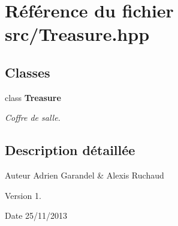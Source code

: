 \section{Référence du fichier src/\-Treasure.hpp}
\label{_treasure_8hpp}
\subsection*{Classes}
\begin{DoxyCompactItemize}
\item 
class {\bf Treasure}
\begin{DoxyCompactList}\small\item\em Coffre de salle. \end{DoxyCompactList}\end{DoxyCompactItemize}


\subsection{Description détaillée}
\begin{DoxyAuthor}{Auteur}
Adrien Garandel \& Alexis Ruchaud 
\end{DoxyAuthor}
\begin{DoxyVersion}{Version}
1. 
\end{DoxyVersion}
\begin{DoxyDate}{Date}
25/11/2013 
\end{DoxyDate}

